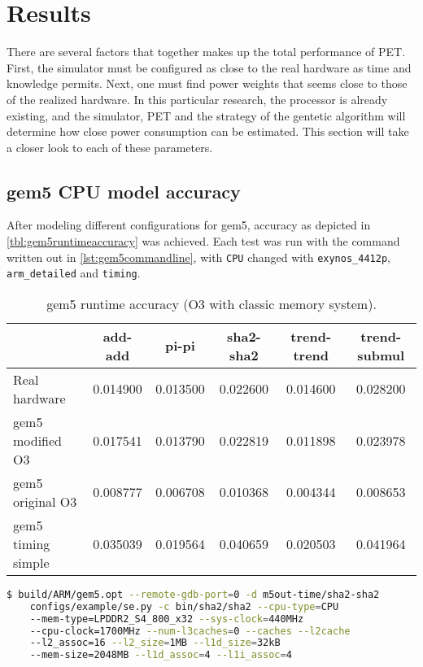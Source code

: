\section{Results}



There are several factors that together makes up the total performance of PET. First, the simulator must be
configured as close to the real hardware as time and knowledge permits. Next, one must find power weights that
seems close to those of the realized hardware. In this particular research, the processor is already existing,
and the simulator, PET and the strategy of the gentetic algorithm will determine how close power consumption
can be estimated. This section will take a closer look to each of these parameters.

\subsection{gem5 CPU model accuracy}

After modeling different configurations for gem5, accuracy as depicted in \autoref{tbl:gem5runtimeaccuracy}
was achieved. Each test was run with the command written out in \autoref{lst:gem5commandline}, with \texttt{CPU}
changed with  \texttt{exynos\_4412p}, \texttt{arm\_detailed} and \texttt{timing}.

\begin{table}
\centering
\begin{tabular}{|l|c|c|c|c|c|}
\hline
   & add-add & pi-pi & sha2-sha2 & trend-trend & trend-submul\\
\hline
Real hardware & 0.014900  & 0.013500 & 0.022600 & 0.014600 & 0.028200\\
gem5 modified O3    & 0.017541 & 0.013790 & 0.022819 & 0.011898 & 0.023978 \\
gem5 original O3    & 0.008777 & 0.006708 & 0.010368 & 0.004344 & 0.008653\\
gem5 timing simple  & 0.035039 & 0.019564 & 0.040659 & 0.020503 & 0.041964 \\
\hline
\end{tabular}
\caption{gem5 runtime accuracy (O3 with classic memory system).}
\label{tbl:gem5runtimeaccuracy}
\end{table}

\begin{lstlisting}[float=htb,language=sh,numbers=none,label={lst:gem5commandline},caption={gem5 Command Line.}]
$ build/ARM/gem5.opt --remote-gdb-port=0 -d m5out-time/sha2-sha2
    configs/example/se.py -c bin/sha2/sha2 --cpu-type=CPU
    --mem-type=LPDDR2_S4_800_x32 --sys-clock=440MHz
    --cpu-clock=1700MHz --num-l3caches=0 --caches --l2cache
    --l2_assoc=16 --l2_size=1MB --l1d_size=32kB
    --mem-size=2048MB --l1d_assoc=4 --l1i_assoc=4
\end{lstlisting}


